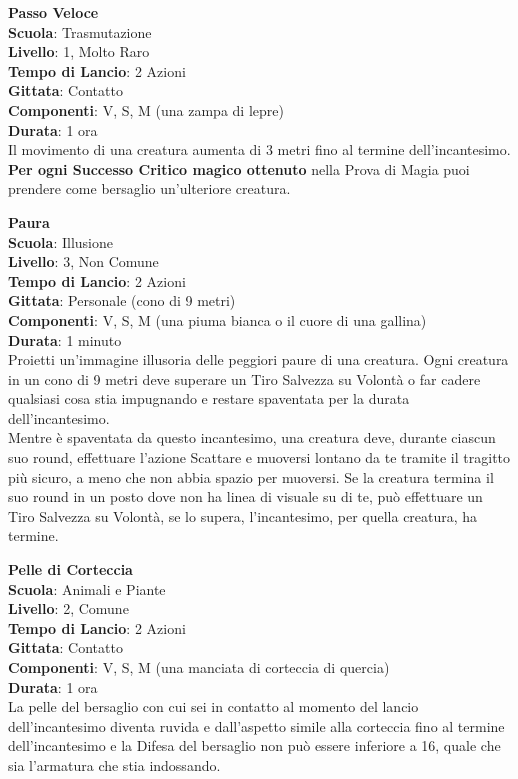 \begin{multicols}{2}
\medskip\textbf{Passo Veloce}\\
\textbf{Scuola}: Trasmutazione\\
\textbf{Livello}: 1, Molto Raro\\
\textbf{Tempo di Lancio}: 2 Azioni\\
\textbf{Gittata}: Contatto\\
\textbf{Componenti}: V, S, M (una zampa di lepre)\\
\textbf{Durata}: 1 ora\\
Il movimento di una creatura aumenta di 3 metri fino al termine dell'incantesimo. \\
\textbf{Per ogni Successo Critico magico ottenuto} nella Prova di Magia puoi prendere come bersaglio un'ulteriore creatura.

\medskip\textbf{Paura}\\
\textbf{Scuola}: Illusione\\
\textbf{Livello}: 3, Non Comune\\
\textbf{Tempo di Lancio}: 2 Azioni\\
\textbf{Gittata}: Personale (cono di 9 metri)\\
\textbf{Componenti}: V, S, M (una piuma bianca o il cuore di una gallina)\\
\textbf{Durata}: 1 minuto\\
Proietti un'immagine illusoria delle peggiori paure di una creatura. Ogni creatura in un cono di 9 metri deve superare un Tiro Salvezza su Volontà o far cadere qualsiasi cosa stia impugnando e restare spaventata per la durata dell'incantesimo.\\
Mentre è spaventata da questo incantesimo, una creatura deve, durante ciascun suo round, effettuare l'azione Scattare e muoversi lontano da te tramite il tragitto più sicuro, a meno che non abbia spazio per muoversi. Se la creatura termina il suo round in un posto dove non ha linea di visuale su di te, può effettuare un Tiro Salvezza su Volontà, se lo supera, l'incantesimo, per quella creatura, ha termine.

\medskip\textbf{Pelle di Corteccia}\\
\textbf{Scuola}: Animali e Piante\\
\textbf{Livello}: 2, Comune\\
\textbf{Tempo di Lancio}: 2 Azioni\\
\textbf{Gittata}: Contatto\\
\textbf{Componenti}: V, S, M (una manciata di corteccia di quercia)\\
\textbf{Durata}: 1 ora\\
La pelle del bersaglio con cui sei in contatto al momento del lancio dell'incantesimo diventa ruvida e dall'aspetto simile alla corteccia fino al termine dell'incantesimo e la Difesa del bersaglio non può essere inferiore a 16, quale che sia l'armatura che stia indossando.


\end{multicols}
